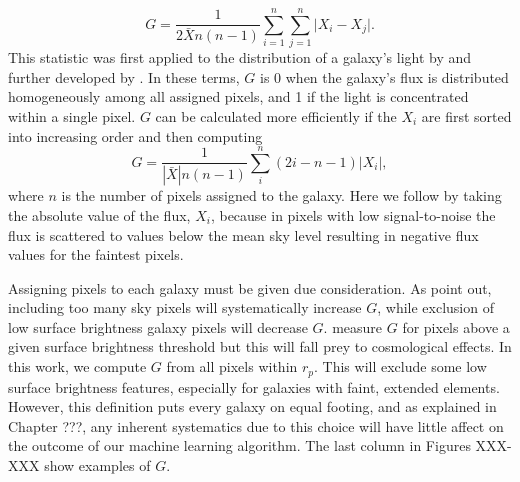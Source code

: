 \begin{equation}
G = \frac{1}{2\bar Xn(n-1)}\sum_{i=1}^n\sum_{j=1}^n\Big|X_i - X_j\Big|.
\end{equation}
This statistic was first applied to the distribution of a galaxy's light by \cite{Abraham2003} and further developed by \cite{Lotz2004}. In these terms, $G$ is 0 when the galaxy's flux is distributed homogeneously among all assigned pixels, and 1 if the light is concentrated within a single pixel. $G$ can be calculated more efficiently if the $X_i$ are first sorted into increasing order and then computing \citep{Glasser1962}
\begin{equation}
G = \frac{1}{|\bar X|n(n-1)}\sum_i^n(2i-n-1)|X_i|,
\end{equation}
where $n$ is the number of pixels assigned to the galaxy. Here we follow \cite{Lotz2004} by taking the absolute value of the flux, $X_i$, because in pixels with low signal-to-noise the flux is scattered to values below the mean sky level resulting in negative flux values for the faintest pixels. 

Assigning pixels to each galaxy must be given due consideration. As \cite{Lotz2004} point out, including too many sky pixels will systematically increase $G$, while exclusion of low surface brightness galaxy pixels will decrease $G$. \cite{Abraham2003} measure $G$ for pixels above a given surface brightness threshold but this will fall prey to cosmological effects. In this work, we compute $G$ from all pixels within $r_p$. This will exclude some low surface brightness features, especially for galaxies with faint, extended elements. However, this definition puts every galaxy on equal footing, and as explained in Chapter ???, any inherent systematics due to this choice will have little affect on the outcome of our machine learning algorithm. The last column in Figures XXX-XXX show examples of $G$.

